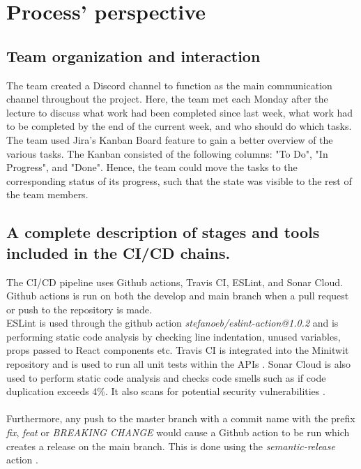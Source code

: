\section{Process' perspective}

\subsection{Team organization and interaction}
The team created a Discord channel to function as the main communication channel throughout the project. Here, the team met each Monday after the lecture to discuss what work had been completed since last week, what work had to be completed by the end of the current week, and who should do which tasks. \\
The team used Jira's Kanban Board feature\cite{jira} to gain a better overview of the various tasks. The Kanban consisted of the following columns: "To Do", "In Progress", and "Done". Hence, the team could move the tasks to the corresponding status of its progress, such that the state was visible to the rest of the team members.

\subsection{A complete description of stages and tools included in the CI/CD chains.}
The CI/CD pipeline uses Github actions, Travis CI, ESLint, and Sonar Cloud. Github actions is run on both the develop and main branch when a pull request or push to the repository is made. \\

ESLint is used through the github action \textit{stefanoeb/eslint-action@1.0.2} \cite{eslint-action} and is performing static code analysis by checking line indentation, unused variables, props passed to React components etc. Travis CI is integrated into the Minitwit repository and is used to run all unit tests within the APIs \cite{travis-ci}. Sonar Cloud is also used to perform static code analysis and checks code smells such as if code duplication exceeds 4\%. It also scans for potential security vulnerabilities \cite{sonarcloud}.\\
\\
Furthermore, any push to the master branch with a commit name with the prefix \textit{fix}, \textit{feat} or \textit{BREAKING CHANGE} would cause a Github action to be run which creates a release on the main branch. This is done using the \textit{semantic-release} action \cite{semantic-release}.

